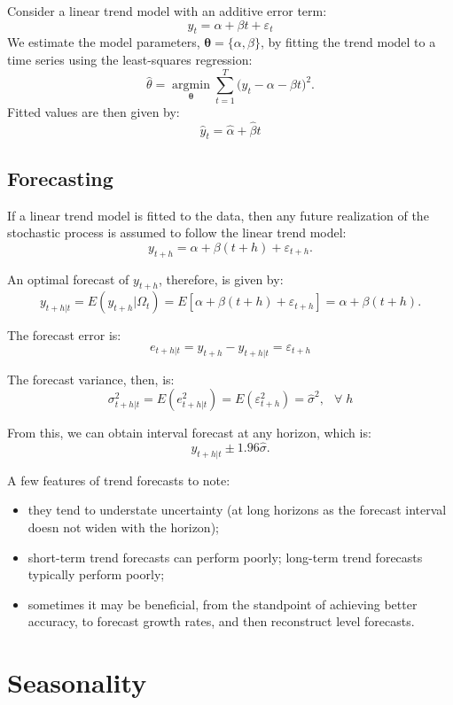 \documentclass[
  oneside]{book}
\providecommand{\tightlist}{%
  \setlength{\itemsep}{0pt}\setlength{\parskip}{0pt}}
\begin{document}
Consider a linear trend model with an additive error term: \[y_t = \alpha + \beta t + \varepsilon_t\] We estimate the model parameters, \(\mathbf{\theta}=\{\alpha,\beta\}\), by fitting the trend model to a time series using the least-squares regression: \[\hat{\theta} = \operatorname*{argmin}_{\mathbf{\theta}} \sum_{t=1}^{T}\big(y_t - \alpha - \beta t\big)^2.\] Fitted values are then given by: \[\hat{y}_t = \hat{\alpha} + \hat{\beta} t\]

\hypertarget{forecasting}{%
\section{Forecasting}\label{forecasting}}

If a linear trend model is fitted to the data, then any future realization of the stochastic process is assumed to follow the linear trend model: \[y_{t+h} = \alpha + \beta (t+h) + \varepsilon_{t+h}.\]

An optimal forecast of \(y_{t+h}\), therefore, is given by: \[y_{t+h|t} = E(y_{t+h}|\Omega_t) = E[\alpha + \beta (t+h) + \varepsilon_{t+h}] = \alpha + \beta (t+h).\]

The forecast error is: \[e_{t+h|t} = y_{t+h} - y_{t+h|t} = \varepsilon_{t+h}\]

The forecast variance, then, is: \[\sigma_{t+h|t}^2 = E(e_{t+h|t}^2) =  E(\varepsilon_{t+h}^2) = \hat{\sigma}^2,\;~~\forall\;h\]

From this, we can obtain interval forecast at any horizon, which is: \[y_{t+h|t} \pm 1.96 \hat{\sigma}.\]

A few features of trend forecasts to note:

\begin{itemize}
\tightlist
\item
  they tend to understate uncertainty (at long horizons as the forecast interval doesn not widen with the horizon);
\item
  short-term trend forecasts can perform poorly; long-term trend forecasts typically perform poorly;
\item
  sometimes it may be beneficial, from the standpoint of achieving better accuracy, to forecast growth rates, and then reconstruct level forecasts.
\end{itemize}

\hypertarget{seasonality}{%
\chapter{Seasonality}\label{seasonality}}
\end{document}
